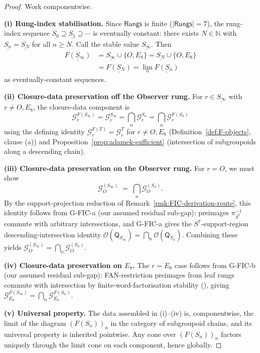 \documentclass[11pt, a4paper]{amsart}
\theoremstyle{definition}
\newcommand{\N}{\mathbb{N}}
\newcommand{\Rungs}{\mathsf{Rungs}}
\newcommand{\Gcal}{\mathcal{G}}
\newcommand{\Qalg}{\mathsf{Q}}
\begin{document}
\begin{proof}[Proof]
Work componentwise.

\textbf{(i) Rung-index stabilisation.} Since $\Rungs$ is finite
($|\Rungs| = 7$), the rung-index sequence
$\underline{S_0} \supseteq \underline{S_1} \supseteq \cdots$ is
eventually constant: there exists $N \in \N$ with
$\underline{S_n} = \underline{S_N}$ for all $n \geq N$. Call the
stable value $\underline{S_\infty}$. Then
\begin{align*}
    \underline{F(S_\infty)} &= \underline{S_\infty} \cup \{O, E_8\}
      = \underline{S_N} \cup \{O, E_8\} \\
    &= \underline{F(S_N)} = \lim_n \underline{F(S_n)}
\end{align*}
as eventually-constant sequences.

\textbf{(ii) Closure-data preservation off the Observer rung.} For
$r \in \underline{S_\infty}$ with $r \ne O, E_8$, the closure-data
component is
\[
    \Gcal_r^{F(S_\infty)} = \Gcal_r^{S_\infty}
      = \bigcap_n \Gcal_r^{S_n} = \bigcap_n \Gcal_r^{F(S_n)}
\]
using the defining identity $\Gcal_r^{F(T)} = \Gcal_r^T$ for $r
\ne O, E_8$ (Definition~\ref{def:F-objects}, clause (a)) and
Proposition~\ref{prop:adamek-sufficient} (intersection of
subgroupoids along a descending chain).

\textbf{(iii) Closure-data preservation on the Observer rung.}
For $r = O$, we must show
\[
    \Gcal_O^{(S_\infty)}
    \;=\; \bigcap_n \Gcal_O^{(S_n)}.
\]
By the support-projection reduction of
Remark~\ref{rmk:FIC-derivation-route}, this identity follows
from G-FIC-a (our assumed residual sub-gap): preimages
$\pi_{S^7}^{-1}$ commute with arbitrary intersections, and
G-FIC-a gives the $S^7$-support-region descending-intersection
identity $\mathcal{O}(\Qalg_{S_\infty}) = \bigcap_n
\mathcal{O}(\Qalg_{S_n})$. Combining these yields
$\Gcal_O^{(S_\infty)} = \bigcap_n \Gcal_O^{(S_n)}$.

\textbf{(iv) Closure-data preservation on $E_8$.} The $r = E_8$
case follows from G-FIC-b (our assumed residual sub-gap):
FAN-restriction preimages from leaf rungs commute with
intersection by finite-word-factorisation stability
(\cite{CascadeHFICClosure}), giving $\Gcal_{E_8}^{F(S_\infty)} =
\bigcap_n \Gcal_{E_8}^{F(S_n)}$.

\textbf{(v) Universal property.} The data assembled in (i)--(iv)
is, componentwise, the limit of the diagram $(F(S_n))_n$ in the
category of subgroupoid chains, and its universal property is
inherited pointwise. Any cone over $(F(S_n))_n$ factors uniquely
through the limit cone on each component, hence globally.
\end{proof}
\end{document}
